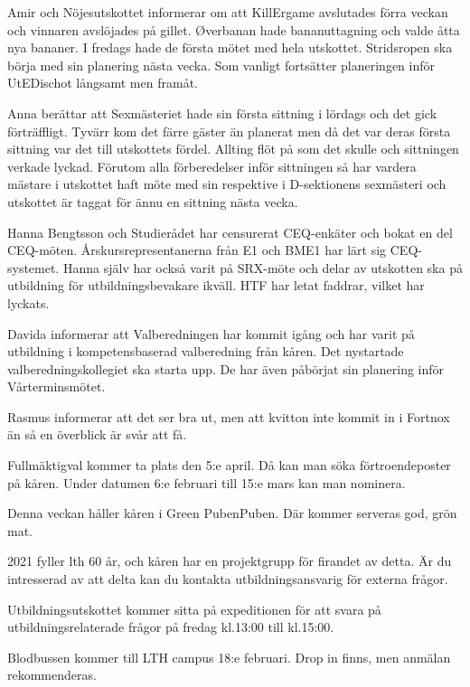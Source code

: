 \documentclass[10pt]{article}
\begin{document}
\begin{paragrafer}
\begin{paragrafer}
Amir och Nöjesutskottet informerar om att KillErgame avslutades förra veckan och vinnaren avslöjades på gillet. 
Øverbanan hade bananuttagning och valde åtta nya bananer. 
I fredags hade de första mötet med hela utskottet. 
Stridsropen ska börja med sin planering nästa vecka. 
Som vanligt fortsätter planeringen inför UtEDischot långsamt men framåt.

Anna berättar att Sexmästeriet hade sin första sittning i lördags och det gick förträffligt. 
Tyvärr kom det färre gäster än planerat men då det var deras första sittning var det till utskottets fördel. 
Allting flöt på som det skulle och sittningen verkade lyckad.
Förutom alla förberedelser inför sittningen så har vardera mästare i utskottet haft möte med sin respektive i D-sektionens sexmästeri och utskottet är taggat för ännu en sittning nästa vecka. 

Hanna Bengtsson och Studierådet har censurerat CEQ-enkäter och bokat en del CEQ-möten. 
Årskursrepresentanerna från E1 och BME1 har lärt sig CEQ-systemet. 
Hanna själv har också varit på SRX-möte och delar av utskotten ska på utbildning för utbildningsbevakare ikväll. 
HTF har letat faddrar, vilket har lyckats. 

Davida informerar att Valberedningen har kommit igång och har varit på utbildning i kompetensbaserad valberedning från kåren. 
Det nystartade valberedningskollegiet ska starta upp.
De har även påbörjat sin planering inför Vårterminsmötet.

 
Rasmus informerar att det ser bra ut, men att kvitton inte kommit in i Fortnox än så en överblick är svår att få.
 

Fullmäktigval kommer ta plats den 5:e april. Då kan man söka förtroendeposter på kåren. Under datumen 6:e februari till 15:e mars kan man nominera. 

Denna veckan håller kåren i Green PubenPuben. Där kommer serveras god, grön mat.

2021 fyller lth 60 år, och kåren har en projektgrupp för firandet av detta. Är du intresserad av att delta kan du kontakta utbildningsansvarig för externa frågor.

Utbildningsutskottet kommer sitta på expeditionen för att svara på utbildningsrelaterade frågor på fredag kl.13:00 till kl.15:00.

Blodbussen kommer till LTH campus 18:e februari. Drop in finns, men anmälan rekommenderas.


\end{paragrafer}
\end{paragrafer}
\end{document}
